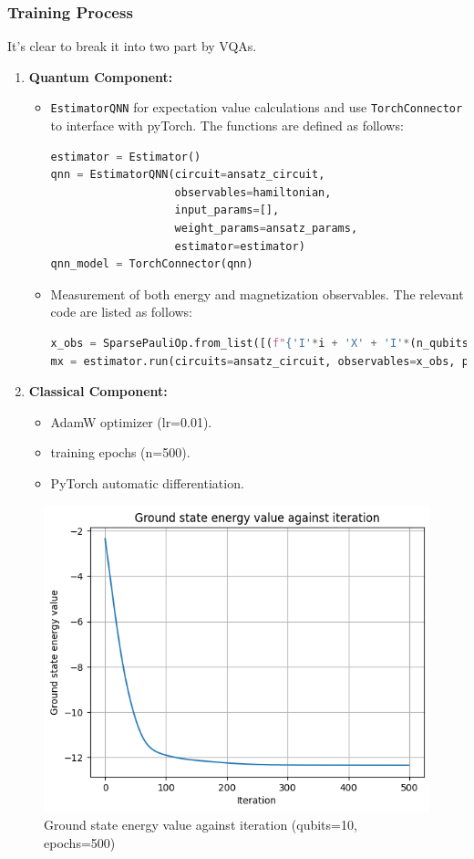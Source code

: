 \documentclass[pre,twocolumn,floatfix]{revtex4-1}
\begin{document}
\subsubsection{Training Process}
It's clear to break it into two part by VQAs.
\begin{enumerate}
    \item \textbf{Quantum Component:}
    \begin{itemize}
        \item \verb|EstimatorQNN| for expectation value calculations and use \verb|TorchConnector| to interface with pyTorch. 
        The functions are defined as follows:
        \begin{lstlisting}[language=Python]
estimator = Estimator()
qnn = EstimatorQNN(circuit=ansatz_circuit,
                   observables=hamiltonian,
                   input_params=[],
                   weight_params=ansatz_params,
                   estimator=estimator)
qnn_model = TorchConnector(qnn)
\end{lstlisting}
    \item Measurement of both energy and magnetization observables.
    The relevant code are listed as follows:
    \begin{lstlisting}[language=Python]
x_obs = SparsePauliOp.from_list([(f"{'I'*i + 'X' + 'I'*(n_qubits - i - 1)}", 1.0) for i in range(n_qubits)])
mx = estimator.run(circuits=ansatz_circuit, observables=x_obs, parameter_values=[final_weights]).result().values[0] / n_qubits
    \end{lstlisting}
    \end{itemize}
    \item \textbf{Classical Component:}
    \begin{itemize}
        \item AdamW optimizer (lr=0.01).
        \item training epochs (n=500).
        \item PyTorch automatic differentiation.
    \end{itemize}
\end{enumerate}

\begin{figure}[H]
    \centering
    \includegraphics[width=0.5\linewidth]{images/iteration.png}
    \caption{Ground state energy value against iteration (qubits=10, epochs=500)}
    \label{5}
\end{figure}
\end{document}
